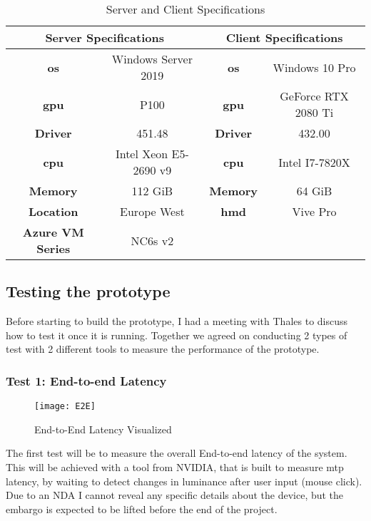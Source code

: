 \begin{table}[h]	
\begin{center}
\caption{Server and Client Specifications}
\begin{tabular}{ |c|c|c|c| } 
\hline
\multicolumn{2}{|c|}{Server Specifications} & \multicolumn{2}{|c|}{Client Specifications}\\ 
\hline\hline
\textbf{\acrshort{os}} & Windows Server 2019  &  \textbf{\acrshort{os}} & Windows 10 Pro\\ 
\hline
\textbf{\acrshort{gpu}} & P100 & \textbf{\acrshort{gpu}} & GeForce RTX 2080 Ti\\ 
\hline
\textbf{Driver} & 451.48 &  \textbf{Driver} & 432.00\\ 
\hline
\textbf{\acrshort{cpu}} & Intel Xeon E5-2690 v9 & \textbf{\acrshort{cpu}} & Intel I7-7820X\\
\hline
\textbf{Memory} & 112 GiB & \textbf{Memory} & 64 GiB\\
\hline
\textbf{Location} & Europe West & \textbf{\acrshort{hmd}} & Vive Pro\\
\hline
\textbf{Azure VM Series} & NC6s v2 & & \\
\hline
\end{tabular}
\end{center}

\end{table}

\subsection{Testing the prototype}
Before starting to build the prototype, I had a meeting with Thales to discuss how to test it once it is running. Together we agreed on conducting 2 types of test with 2 different tools to measure the performance of the prototype.

\subsubsection{Test 1: End-to-end Latency}
\begin{figure}[h!]
\caption{End-to-End Latency Visualized \parencite{e2e}}
\label{fig:e2e}
\texttt{[image: E2E]}
\end{figure}
The first test will be to measure the overall End-to-end latency of the system. This will be achieved with a tool from NVIDIA, that is built to measure \acrshort{mtp} latency, by waiting to detect changes in luminance after user input (mouse click). Due to an NDA I cannot reveal any specific details about the device, but the embargo is expected to be lifted before the end of the project.

